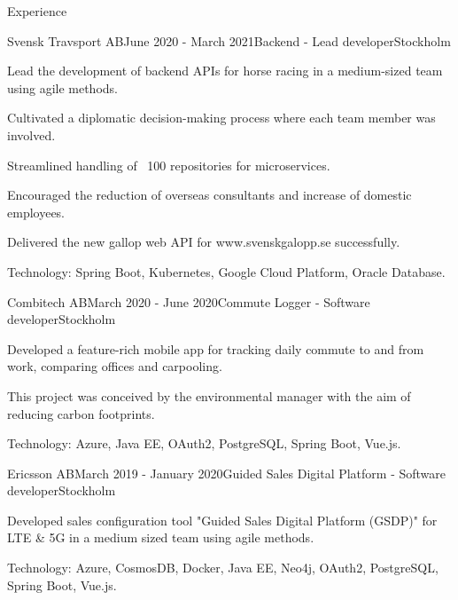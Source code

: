 \documentclass{resume}
\begin{document}
  \begin{rSection}{Experience}
    \begin{rSubsection}{Svensk Travsport AB}{June 2020 - March 2021}{Backend - Lead developer}{Stockholm}
      \item Lead the development of backend APIs for horse racing in a medium-sized team using agile methods.
      \item Cultivated a diplomatic decision-making process where each team member was involved.
      \item Streamlined handling of ~100 repositories for microservices.
      \item Encouraged the reduction of overseas consultants and increase of domestic employees.
      \item Delivered the new gallop web API for www.svenskgalopp.se successfully.
      \item Technology: Spring Boot, Kubernetes, Google Cloud Platform, Oracle Database.
    \end{rSubsection}

    \begin{rSubsection}{Combitech AB}{March 2020 - June 2020}{Commute Logger - Software developer}{Stockholm}
      \item Developed a feature-rich mobile app for tracking daily commute to and from work, comparing offices and carpooling.
      \item This project was conceived by the environmental manager with the aim of reducing carbon footprints.
      \item Technology: Azure, Java EE, OAuth2, PostgreSQL, Spring Boot, Vue.js.
    \end{rSubsection}

    \begin{rSubsection}{Ericsson AB}{March 2019 - January 2020}{Guided Sales Digital Platform - Software developer}{Stockholm}
      \item Developed sales configuration tool "Guided Sales Digital Platform (GSDP)" for LTE \& 5G in a medium sized team using agile methods.
      \item Technology: Azure, CosmosDB, Docker, Java EE, Neo4j, OAuth2, PostgreSQL, Spring Boot, Vue.js.
    \end{rSubsection}


\end{rSection}
\end{document}
